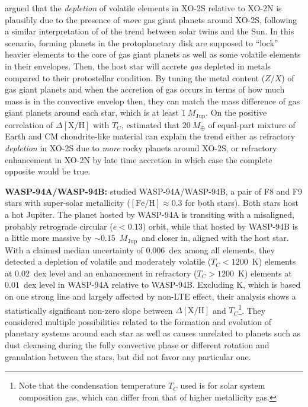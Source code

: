 \documentclass[manuscript]{aastex6}
\newcommand*\elem[1]{\ensuremath{\mathrm{#1}}}
\newcommand*\elemH[1]{\ensuremath{[\mathrm{#1}/\elem{H}]}}
\newcommand*{\feh}{\ensuremath{\elemH{Fe}}}
\newcommand{\Tcondens}{\ensuremath{T_C}}
\newcommand{\mearth}{\ensuremath{M_\oplus}}
\newcommand{\mjupiter}{\ensuremath{M_\mathrm{Jup}}}
\begin{document}
\citealt{Ramirez:2015aa} argued that the {\it depletion} of volatile elements
in XO-2S relative to XO-2N is plausibly due to the presence of {\it more} gas
giant planets around XO-2S, following a similar interpretation of
\citealt{Melendez:2009aa} of the trend between solar twins and the Sun.
In this scenario, forming planets in the protoplanetary disk are supposed to
``lock'' heavier elements to the core of gas giant planets as well as some
volatile elements in their envelopes. Then, the host star will accrete {\it
  gas} depleted in metals compared to their protostellar condition.
By tuning the metal content ($Z/X$) of gas giant planets and when the accretion
of gas occurs in terms of how much mass is in the convective envelop then, they
can match the mass difference of gas giant planets around each star, which is
at least $1~\mjupiter$.
On the positive correlation of $\Delta\elemH{X}$ with \Tcondens,
\citealt{Ramirez:2015aa} estimated that $20~\mearth$ of equal-part mixture of
Earth and CM chondrite-like material can explain the trend either as refractory
{\it depletion} in XO-2S due to {\it more} rocky planets around XO-2S, or
refractory enhancement in XO-2N by late time accretion in which case the
complete opposite would be true.


{\bf WASP-94A/WASP-94B:} 
\citealt{Teske:2016aa} studied WASP-94A/WASP-94B, a pair of F8 and F9 stars
with super-solar metallicity ($\feh\approx 0.3$ for both stars). Both stars
host a hot Jupiter.
The planet hosted by WASP-94A is transiting with a misaligned, probably
retrograde circular ($e<0.13$) orbit, while that hosted by WASP-94B is a little
more massive by $\sim 0.15$~\mjupiter\ and closer in, aligned with the host
star.
With a claimed median uncertainty of $0.006$~dex among all elements, they
detected a depletion of volatile and moderately volatile ($\Tcondens < 1200$~K)
elements at $0.02$~dex level and an enhancement in refractory ($\Tcondens >
1200$~K) elements at $0.01$~dex level in WASP-94A relative to WASP-94B.
Excluding K, which is based on one strong line and largely affected by non-LTE
effect, their analysis shows a statistically significant non-zero slope between
$\Delta\elemH{X}$ and $\Tcondens$\footnote{
  Note that the condensation
  temperature $\Tcondens$ used is for solar system composition
  gas, which can differ from that of higher metallicity gas.}.
They considered multiple possibilities related to the formation and evolution
of planetary systems around each star as well as causes unrelated to planets
such as dust cleansing during the fully convective phase or different rotation
and granulation between the stars, but did not favor any particular one.
\end{document}
